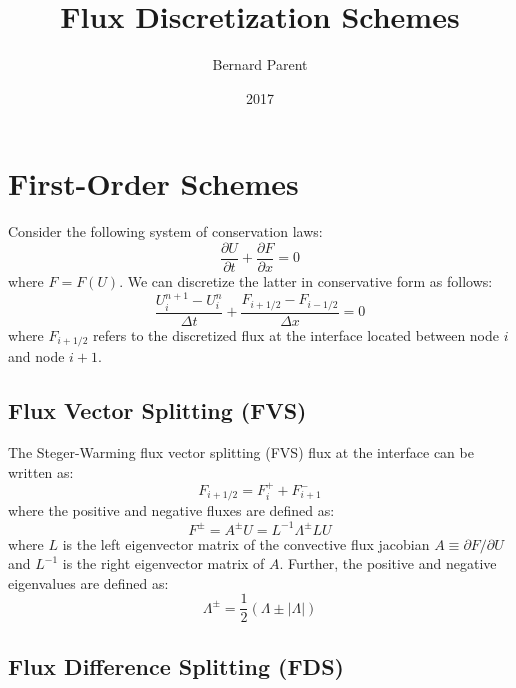 \documentclass{warpdoc}
\author{
  Bernard Parent
}
\title{
  Flux Discretization Schemes
}
\date{
  2017
}
\begin{document}
  \pagestyle{headings}
  \setcounter{page}{1}
  \makewarpdoctitle
  \tableofcontents


\section{First-Order Schemes}

Consider the following system of conservation laws:
%
\begin{equation}
\frac{\partial U}{\partial t}+ \frac{\partial F}{\partial x}=0
\end{equation}
%
where $F=F(U)$. We can discretize the latter in conservative form as follows:
%
\begin{equation}
\frac{U^{n+1}_i-U^n_i}{\Delta t}+ \frac{F_{i+1/2}-F_{i-1/2}}{\Delta x}=0
\end{equation}
%
where $F_{i+1/2}$ refers to the discretized flux at the interface located between node $i$ and node $i+1$.

\subsection{Flux Vector Splitting (FVS)}

The Steger-Warming flux vector splitting (FVS) \cite{jcp:1981:steger} flux at the interface can be written as:
%
\begin{equation}
F_{i+1/2}=F^+_{i} + F^-_{i+1} 
\end{equation}
%
where the positive and negative fluxes are defined as:
%
\begin{equation}
F^\pm= A^\pm U = L^{-1} \Lambda^\pm L U 
\end{equation}
%
where $L$ is the left eigenvector matrix of the convective flux jacobian $A\equiv\partial F/\partial U$ and $L^{-1}$ is the right eigenvector matrix of $A$.
Further, the positive and negative eigenvalues are defined as:
%
\begin{equation}
\Lambda^\pm = \frac{1}{2}\left( \Lambda \pm |\Lambda|\right)
\end{equation}
%

\subsection{Flux Difference Splitting (FDS)}
\end{document}
